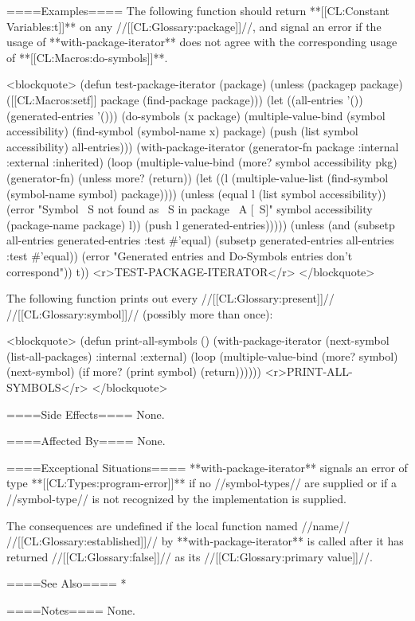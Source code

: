 ====Examples====
The following function should return **[[CL:Constant Variables:t]]** on any //[[CL:Glossary:package]]//, and signal an error if the usage of **with-package-iterator** does not agree with the corresponding usage of **[[CL:Macros:do-symbols]]**.

<blockquote> 
(defun test-package-iterator (package) 
  (unless (packagep package) 
    ([[CL:Macros:setf]] package (find-package package)))
  (let ((all-entries '()) 
        (generated-entries '()))
    (do-symbols (x package) 
      (multiple-value-bind (symbol accessibility) 
          (find-symbol (symbol-name x) package) 
        (push (list symbol accessibility) all-entries)))
    (with-package-iterator 
        (generator-fn package :internal :external :inherited) 
      (loop 
        (multiple-value-bind (more? symbol accessibility pkg) (generator-fn)
          (unless more? (return)) 
          (let ((l (multiple-value-list 
                     (find-symbol (symbol-name symbol) package))))
            (unless (equal l (list symbol accessibility)) 
              (error "Symbol ~S not found as ~S in package ~A [~S]"
                     symbol accessibility (package-name package) l))
            (push l generated-entries)))))
    (unless (and (subsetp all-entries generated-entries :test #'equal) 
                 (subsetp generated-entries all-entries :test #'equal))
      (error "Generated entries and Do-Symbols entries don't correspond")) 
    t)) <r>TEST-PACKAGE-ITERATOR</r>
</blockquote>

The following function prints out every //[[CL:Glossary:present]]// //[[CL:Glossary:symbol]]// (possibly more than once):

<blockquote>
(defun print-all-symbols () 
  (with-package-iterator 
      (next-symbol (list-all-packages) :internal :external)
    (loop 
      (multiple-value-bind (more? symbol) (next-symbol)
        (if more? 
            (print symbol) 
            (return)))))) <r>PRINT-ALL-SYMBOLS</r>
</blockquote>

====Side Effects====
None.

====Affected By====
None.

====Exceptional Situations====
**with-package-iterator** signals an error of type **[[CL:Types:program-error]]** if no //symbol-types// are supplied or if a //symbol-type// is not recognized by the implementation is supplied.

The consequences are undefined if the local function named //name// //[[CL:Glossary:established]]// by **with-package-iterator** is called after it has returned //[[CL:Glossary:false]]// as its //[[CL:Glossary:primary value]]//.

====See Also====
  * {\secref\TraversalRules}

====Notes====
None.

  
